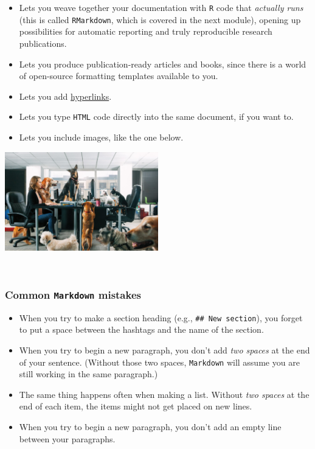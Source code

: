 \documentclass[
]{book}
\begin{document}
\begin{itemize}
\item
  Lets you weave together your documentation with \texttt{R} code that
  \emph{actually runs} (this is called \texttt{RMarkdown}, which is covered
  in the next module), opening up possibilities for automatic reporting
  and truly reproducible research publications.
\item
  Lets you produce publication-ready articles and books, since there is a
  world of open-source formatting templates available to you.
\item
  Lets you add \href{https://www.markdownguide.org/getting-started/}{hyperlinks}.
\item
  Lets you type \texttt{HTML} code directly into the same document,
  if you want to.
\item
  Lets you include images, like the one below.
\end{itemize}

\includegraphics[width=0.5\textwidth,height=\textheight]{img/markdown-dogs.jpeg}

~

\hypertarget{common-markdown-mistakes}{%
\subsubsection*{\texorpdfstring{Common \texttt{Markdown} mistakes}{Common Markdown mistakes}}\label{common-markdown-mistakes}}

\begin{itemize}
\item
  When you try to make a section heading (e.g., \texttt{\#\#\ New\ section}),
  you forget to put a space between the hashtags and the name of the section.
\item
  When you try to begin a new paragraph, you don't add \emph{two spaces}
  at the end of your sentence. (Without those two spaces, \texttt{Markdown}
  will assume you are still working in the same paragraph.)
\item
  The same thing happens often when making a list. Without \emph{two spaces}
  at the end of each item, the items might not get placed on new lines.
\item
  When you try to begin a new paragraph, you don't add an empty line
  between your paragraphs.
\end{itemize}
\end{document}

